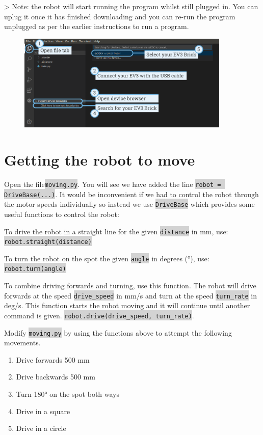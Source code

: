 \documentclass[12pt,a4paper]{article}
\newcommand{\code}[1]{\colorbox{lightgray}{\texttt{#1}}}
\begin{document}
> Note: the robot will start running the program whilst still plugged in. You can uplug it once it has finished downloading and you can re-run the program unplugged as per the earlier instructions to run a program.

\begin{figure}[h]
    \centering
    \includegraphics[width=0.9\textwidth]{assets/connecting_ev3.png}
\end{figure}

\section{ Getting the robot to move}

Open the file\code{moving.py}. You will see we have added the line \code{robot = DriveBase(...)}. 
It would be inconvenient if we had to control the robot through the motor speeds individually so instead we use \code{DriveBase} which provides some useful functions to control the robot:

To drive the robot in a straight line for the given \code{distance} in mm, use:
\code{robot.straight(distance)}


To turn the robot on the spot the given \code{angle} in degrees (°), use:
\code{robot.turn(angle)}


To combine driving forwards and turning, use this function. The robot will drive forwards at the speed \code{drive\_speed} in mm/s and turn at the speed \code{turn\_rate} in deg/s. This function starts the robot moving and it will continue until another command is given.
\code{robot.drive(drive\_speed, turn\_rate)}.

Modify \code{moving.py} by using the functions above to attempt the following movements.

\begin{enumerate}
    \item Drive forwards 500 mm 
    \item Drive backwards 500 mm 
    \item Turn 180° on the spot both ways 
    \item Drive in a square 
    \item Drive in a circle 
\end{enumerate}
\end{document}
